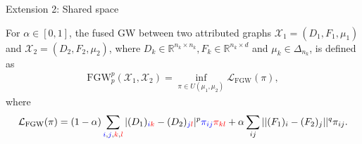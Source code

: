 \documentclass{beamer}
\newcommand{\fgw}{\text{FGW}}
\newcommand{\cX}{\mathcal X}
\newcommand{\cL}{\mathcal L}
\newcommand{\bbR}{\mathbb R}
\begin{document}
\begin{frame}{Extension 2: Shared space}
  \scriptsize
  \begin{definition}
    For $\alpha \in [0, 1]$, the fused GW between two attributed graphs
    $\cX_1 = (D_1, F_1, \mu_1)$ and $\cX_2 = (D_2, F_2, \mu_2)$,
    where $D_k \in \bbR^{n_k \times n_k}, F_k \in \bbR^{n_k \times d}$
    and $\mu_k \in \Delta_{n_k}$, is defined as
    \begin{align*}
      \fgw_p^p(\cX_1, \cX_2) = \inf_{\pi \in U(\mu_1, \mu_2)} \cL_{\fgw}(\pi),
    \end{align*}
    \vspace{-0.3cm}
    where
    \begin{align*}
      \cL_{\fgw}(\pi) = (1 - \alpha)
      \sum_{{\color{blue}{i}},{\color{blue}{j}},{\color{red}{k}},{\color{red}{l}}}
      |(D_1)_{{\color{blue}{i}} {\color{red}{k}}} - (D_2)_{{\color{blue}{j}}{\color{red}{l}}}|^p {\color{blue}{\pi_{ij}}} {\color{red}{\pi_{kl}}}
      + \alpha \sum_{ij} ||(F_1)_i - (F_2)_j||^q \pi_{ij}.
    \end{align*}
  \end{definition}



\end{frame}
\end{document}
